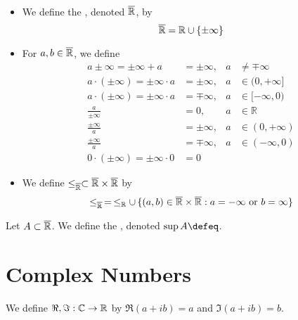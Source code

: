 \documentclass{book}
\begin{document}
	\begin{defn}\
		\begin{itemize}
			\item We define the , denoted $\overline{\mathbb{R}}$, by 
			$$ \overline{\mathbb{R}} = \mathbb{R} \cup \{\pm \infty\}$$
			\item For $a,b \in \overline{\mathbb{R}}$, we define
			\begin{align*}
				a \pm \infty = \pm\infty + a & = \pm\infty, & a & \neq \mp\infty \\
				a \cdot (\pm\infty) = \pm\infty \cdot a & = \pm\infty, & a & \in (0, +\infty] \\
				a \cdot (\pm\infty) = \pm\infty \cdot a & = \mp\infty, & a & \in [-\infty, 0) \\
				\frac{a}{\pm\infty} & = 0, & a & \in \mathbb{R} \\
				\frac{\pm\infty}{a} & = \pm\infty, & a & \in (0, +\infty) \\
				\frac{\pm\infty}{a} & = \mp\infty, & a & \in (-\infty, 0) \\
				0 \cdot (\pm\infty) = \pm\infty \cdot 0 & = 0
			\end{align*}
			\item We define $\leq_{\overline{\mathbb{R}}} \subset \overline{\mathbb{R}} \times \overline{\mathbb{R}}$ by 
			$$\leq_{\overline{\mathbb{R}}} \, = \, \leq_{\mathbb{R}} \cup \, \{(a,b) \in \overline{\mathbb{R}} \times \overline{\mathbb{R}}: a = - \infty \text{ or } b = \infty\}$$
		\end{itemize}
	\end{defn}
	
	\begin{defn}
		Let $A \subset \overline{\mathbb{R}}$. We define the , denoted $\sup A \defeq$.
	\end{defn}
	
	
	
	
	
	
	
	
	
	
	
	
	
	
	
	
	
	
	
	\section{Complex Numbers}
	
	We define $\Re, \Im: \mathbb{C} \rightarrow \mathbb{R}$ by $\Re(a + ib) = a$ and $\Im(a+ib) = b$.
	
	
	
	
	
\end{document}
